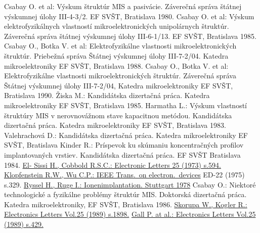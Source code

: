 \begin{thebibliography}{}
 Csabay O. et al: Výskum štruktúr MIS a
  pasivácie. Záverečná správa štátnej výskumnej úlohy III-4-3/2. EF
  SVŠT, Bratislava 1980.
 Csabay O. et al: Výskum elektrofyzikálnych
  vlastností mikroelektronických unipolárnych štruktúr. Záverečná
  správa štátnej výskumnej úlohy III-6-1/13. EF SVŠT, Bratislava 1985.
 Csabay O., Botka V. et al: Elektrofyzikálne
  vlastnosti mikroelektronických štruktúr. Priebežná správa Štátnej
  výskumnej úlohy III-7-2/04. Katedra mikroelektroniky EF SVŠT,
  Bratislava 1988.
 Csabay O., Botka V. et al: Elektrofyzikálne
  vlastnosti mikroelektronických štruktúr. Záverečná správa Štátnej
  výskumnej úlohy III-7-2/04, Katedra mikroelektroniky EF SVŠT,
  Bratislava 1990.
 Žiska M.: Kandidátska dizertačná práca. Katedra
  mikroelektroniky EF SVŠT, Bratislava 1985.
 Harmatha L.: Výskum vlastností štruktúry MIS v
  nerovnovážnom stave kapacitnou metódou. Kandidátska dizertačná
  práca. Katedra mikroelektroniky EF SVŠT, Bratislava 1983.
 Valehrachová D.: Kandidátska dizertačná
  práca. Katedra mikroelektroniky EF SVŠT, Bratislava
 Kinder R.: Príspevok ku skúmaniu koncentračných
  profilov implantovaných vrstiev. Kandidátska dizertačná práca. EF
  SVŠT Bratislava 1984.
  \href{http://ieeexplore.ieee.org/xpl/articleDetails.jsp?arnumber=4236397&filter\%3DAND\%28p_IS_Number\%3A4236383\%29}
  {El- Sissi H., Cobbold R.S.C.: Electronic Letters 25 (1973) s.594.}
  \href{http://ieeexplore.ieee.org/xpl/freeabs_all.jsp?arnumber=1477966}
  {Klopfenstein R.W., Wu C.P.: IEEE Trans.\ on electron.\ devices} ED-22 (1975) s.329.
  \href{http://www.springer.com/us/book/9783519032069}
  {Ryssel H., Ruge I.: Ionenimplantation. Stuttgart 1978}
 Csabay O.: Niektoré technologické a fyzikálne
  problémy štruktúr MIS\@. Doktorská dizertačná práca. Katedra
  mikroelektroniky, EF SVŠT, Bratislava 1986.
  \href{http://ieeexplore.ieee.org/xpl/articleDetails.jsp?arnumber=59491&filter\%3DAND\%28p_IS_Number\%3A2166\%29\%26pageNumber\%3D2}
  {Skorupa W., Kogler R.: Electronics Letters Vol.25 (1989) s.1898.}
  \href{http://ieeexplore.ieee.org/xpl/login.jsp?tp=&arnumber=18492&url=http\%3A\%2F\%2Fieeexplore.ieee.org\%2Fxpls\%2Fabs_all.jsp\%3Farnumber\%3D18492}
  {Gall P. at al.: Electronics Letters Vol.25 (1989) s.429.}
\end{thebibliography}
